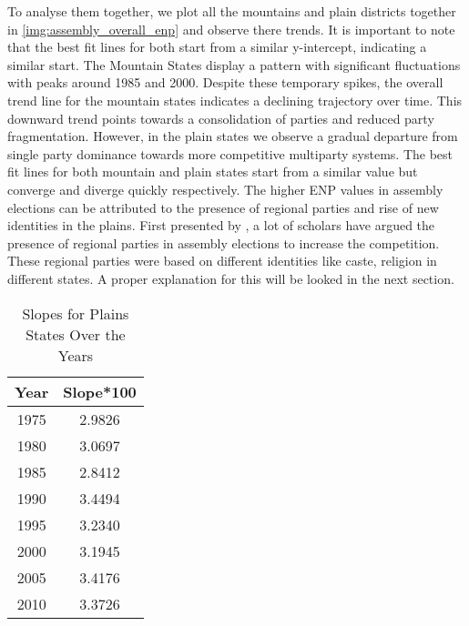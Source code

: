 To analyse them together, we plot all the mountains and plain districts together in \ref{img:assembly_overall_enp} and observe there trends. It is important to note that the best fit lines for both start from a similar y-intercept, indicating a similar start. The Mountain States display a pattern with significant fluctuations with peaks around 1985 and 2000. Despite these temporary spikes, the overall trend line for the mountain states indicates a declining trajectory over time. This downward trend points towards a consolidation of parties and reduced party fragmentation. However, in the plain states we observe a gradual departure from single party dominance towards more competitive multiparty systems. The best fit lines for both mountain and plain states start from a similar value but converge and diverge quickly respectively. The higher ENP values in assembly elections can be attributed to the presence of regional parties and rise of new identities in the plains. First presented by \citep{lijphart1994}, a lot of scholars have argued the presence of regional parties in assembly elections to increase the competition. These regional parties were based on different identities like caste, religion in different states. A proper explanation for this will be looked in the next section.

\begin{table}[]
    \centering
    \caption{Slopes for Plains States Over the Years}
    \begin{tabular}{|c|c|}
    \hline
    \textbf{Year} & \textbf{Slope*100} \\ \hline
    1975          & 2.9826                 \\ \hline
    1980          & 3.0697                 \\ \hline
    1985          & 2.8412                 \\ \hline
    1990          & 3.4494                 \\ \hline
    1995          & 3.2340                 \\ \hline
    2000          & 3.1945                 \\ \hline
    2005          & 3.4176                 \\ \hline
    2010          & 3.3726                 \\ \hline
    \end{tabular}
    \label{tab:assembly_slopes_plains}
    \end{table}



